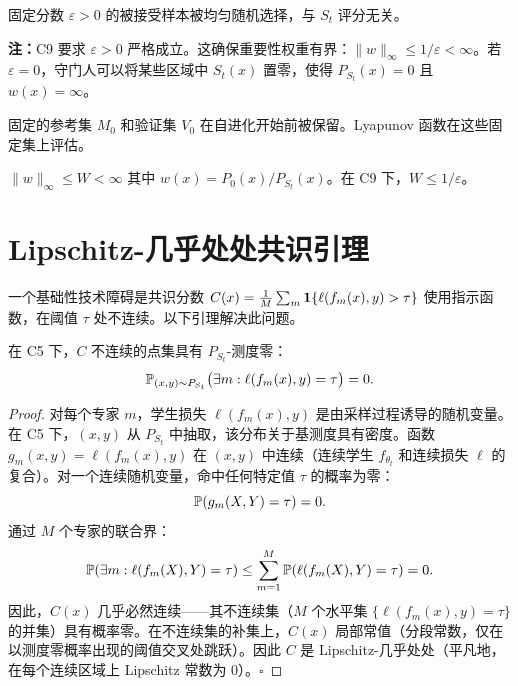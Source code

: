 \begin{assumption}\label{ass:c9}
固定分数 $\varepsilon > 0$ 的被接受样本被均匀随机选择，与 $S_t$ 评分无关。
\end{assumption}

\textbf{注：}C9 要求 $\varepsilon > 0$ 严格成立。这确保重要性权重有界：$\|w\|_\infty \leq 1/\varepsilon < \infty$。若 $\varepsilon = 0$，守门人可以将某些区域中 $S_t(x)$ 置零，使得 $P_{S_t}(x) = 0$ 且 $w(x) = \infty$。

\begin{assumption}\label{ass:c10}
固定的参考集 $M_0$ 和验证集 $V_0$ 在自进化开始前被保留。Lyapunov 函数在这些固定集上评估。
\end{assumption}

\begin{assumption}[C11: 有界重要性权重]\label{ass:c11}
$\|w\|_\infty \leq W < \infty$ 其中 $w(x) = P_0(x)/P_{S_t}(x)$。在 C9 下，$W \leq 1/\varepsilon$。
\end{assumption}

\section{Lipschitz-几乎处处共识引理}

一个基础性技术障碍是共识分数 $C(x) = \frac{1}{M}\sum_m \mathbf{1}\{\ell(f_m(x), y) > \tau\}$ 使用指示函数，在阈值 $\tau$ 处不连续。以下引理解决此问题。

\begin{lemma}\label{lem:lae}
在 C5 下，$C$ 不连续的点集具有 $P_{S_t}$-测度零：
\begin{equation}
    \mathbb{P}_{(x,y) \sim P_{S_t}}\bigl(\exists m: \ell(f_m(x), y) = \tau\bigr) = 0.
\end{equation}
\end{lemma}

\begin{proof}
对每个专家 $m$，学生损失 $\ell(f_m(x), y)$ 是由采样过程诱导的随机变量。在 C5 下，$(x, y)$ 从 $P_{S_t}$ 中抽取，该分布关于基测度具有密度。函数 $g_m(x, y) = \ell(f_m(x), y)$ 在 $(x, y)$ 中连续（连续学生 $f_{\theta_t}$ 和连续损失 $\ell$ 的复合）。对一个连续随机变量，命中任何特定值 $\tau$ 的概率为零：
\begin{equation}
    \mathbb{P}(g_m(X, Y) = \tau) = 0.
\end{equation}
通过 $M$ 个专家的联合界：
\begin{equation}
    \mathbb{P}(\exists m: \ell(f_m(X), Y) = \tau) \leq \sum_{m=1}^M \mathbb{P}(\ell(f_m(X), Y) = \tau) = 0.
\end{equation}
因此，$C(x)$ 几乎必然连续——其不连续集（$M$ 个水平集 $\{\ell(f_m(x), y) = \tau\}$ 的并集）具有概率零。在不连续集的补集上，$C(x)$ 局部常值（分段常数，仅在以测度零概率出现的阈值交叉处跳跃）。因此 $C$ 是 Lipschitz-几乎处处（平凡地，在每个连续区域上 Lipschitz 常数为 0）。\hfill $\square$
\end{proof}

